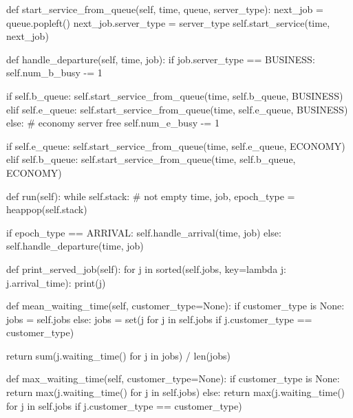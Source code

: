 \begin{exercise}
\begin{solution}
\begin{pyverbatim}
    def start_service_from_queue(self, time, queue, server_type):
        next_job = queue.popleft()
        next_job.server_type = server_type
        self.start_service(time, next_job)

    def handle_departure(self, time, job):
        if job.server_type == BUSINESS:
            self.num_b_busy -= 1

            if self.b_queue:
                self.start_service_from_queue(time, self.b_queue, BUSINESS)
            elif self.e_queue:
                self.start_service_from_queue(time, self.e_queue, BUSINESS)
        else:  # economy server free
            self.num_e_busy -= 1

            if self.e_queue:
                self.start_service_from_queue(time, self.e_queue, ECONOMY)
            elif self.b_queue:
                self.start_service_from_queue(time, self.b_queue, ECONOMY)

    def run(self):
        while self.stack:  # not empty
            time, job, epoch_type = heappop(self.stack)

            if epoch_type == ARRIVAL:
                self.handle_arrival(time, job)
            else:
                self.handle_departure(time, job)

    def print_served_job(self):
        for j in sorted(self.jobs, key=lambda j: j.arrival_time):
            print(j)

    def mean_waiting_time(self, customer_type=None):
        if customer_type is None:
            jobs = self.jobs
        else:
            jobs = set(j for j in self.jobs if j.customer_type == customer_type)

        return sum(j.waiting_time() for j in jobs) / len(jobs)

    def max_waiting_time(self, customer_type=None):
        if customer_type is None:
            return max(j.waiting_time() for j in self.jobs)
        else:
            return max(j.waiting_time() for j in self.jobs
                       if j.customer_type == customer_type)
\end{pyverbatim}
\end{solution}

\end{exercise}


